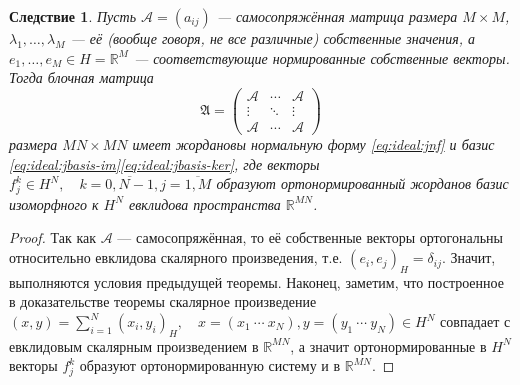 \documentclass{article}
\newtheorem{corollary}{Следствие }
\begin{document}
 \begin{corollary}
     Пусть \( \mathcal{A} = (a_{ij}) \) --- самосопряжённая матрица размера \( M\times M \),
     \( \lambda_1, \ldots, \lambda_M \) --- её (вообще говоря, не все различные) собственные значения,
     а \( e_1, \ldots, e_M \in H=\mathbb{R}^M \) --- соответствующие нормированные собственные векторы.
     Тогда блочная матрица
     \[ \mathfrak{A} = \begin{pmatrix}
         \mathcal{A} & \cdots & \mathcal{A} \\
         \vdots & \ddots & \vdots \\
         \mathcal{A} & \cdots & \mathcal{A}
     \end{pmatrix} \]
     размера \( MN\times MN \) имеет жордановы нормальную форму \eqref{eq:ideal:jnf}
     и базис \eqref{eq:ideal:jbasis-im}\eqref{eq:ideal:jbasis-ker},
     где векторы \( f_j^k\in H^N,\quad k=\overline{0,N-1},j=\overline{1,M} \)
     образуют ортонормированный жорданов базис изоморфного к \( H^N \) евклидова пространства \( \mathbb{R}^{MN} \).
 \end{corollary}
 \begin{proof}
     Так как \( \mathcal{A} \) --- самосопряжённая,
     то её собственные векторы ортогональны относительно евклидова скалярного произведения,
     т.е. \( (e_i, e_j)_H = \delta_{ij} \).
     Значит, выполняются условия предыдущей теоремы.
     Наконец, заметим, что построенное в доказательстве теоремы
     скалярное произведение \( (x,y) = \sum_{i=1}^N (x_i, y_i)_H, \quad x=(x_1~\cdots~x_N),y=(y_1~\cdots~y_N)\in H^N \)
     совпадает с евклидовым скалярным произведением в \( \mathbb{R}^{MN} \),
     а значит ортонормированные в \( H^N \) векторы \( f_j^k \) образуют ортонормированную систему и в \( \mathbb{R}^{MN} \).
 \end{proof}
\end{document}
